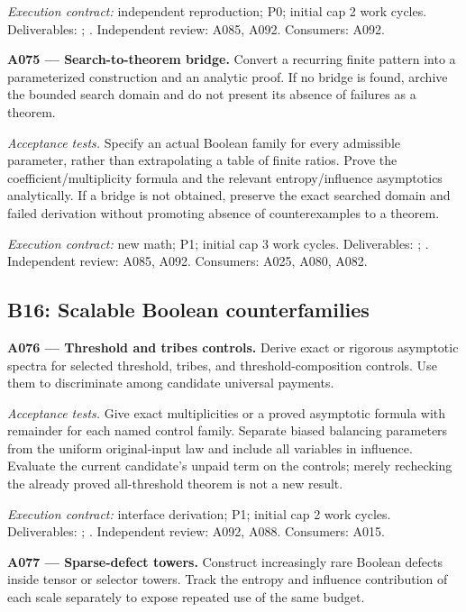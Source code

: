 \documentclass[11pt]{article}
\begin{document}
{\small\emph{Execution contract:} independent reproduction; P0; initial cap 2 work cycles. Deliverables: ; . Independent review: A085, A092. Consumers: A092.}

\textbf{A075 --- Search-to-theorem bridge.} Convert a recurring finite pattern into a parameterized construction and an analytic proof. If no bridge is found, archive the bounded search domain and do not present its absence of failures as a theorem.

\emph{Acceptance tests.} Specify an actual Boolean family for every admissible parameter, rather than extrapolating a table of finite ratios. Prove the coefficient/multiplicity formula and the relevant entropy/influence asymptotics analytically. If a bridge is not obtained, preserve the exact searched domain and failed derivation without promoting absence of counterexamples to a theorem.

{\small\emph{Execution contract:} new math; P1; initial cap 3 work cycles. Deliverables: ; . Independent review: A085, A092. Consumers: A025, A080, A082.}

\subsection{B16: Scalable Boolean counterfamilies}

\textbf{A076 --- Threshold and tribes controls.} Derive exact or rigorous asymptotic spectra for selected threshold, tribes, and threshold-composition controls. Use them to discriminate among candidate universal payments.

\emph{Acceptance tests.} Give exact multiplicities or a proved asymptotic formula with remainder for each named control family. Separate biased balancing parameters from the uniform original-input law and include all variables in influence. Evaluate the current candidate's unpaid term on the controls; merely rechecking the already proved all-threshold theorem is not a new result.

{\small\emph{Execution contract:} interface derivation; P1; initial cap 2 work cycles. Deliverables: ; . Independent review: A092, A088. Consumers: A015.}

\textbf{A077 --- Sparse-defect towers.} Construct increasingly rare Boolean defects inside tensor or selector towers. Track the entropy and influence contribution of each scale separately to expose repeated use of the same budget.
\end{document}
